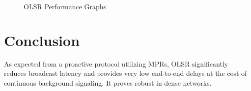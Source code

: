 \documentclass[12pt,a4paper]{report}
\begin{document}
\begin{figure}[H]
    \centering
    \caption{OLSR Performance Graphs}
\end{figure}

\section{Conclusion}
As expected from a proactive protocol utilizing MPRs, OLSR significantly reduces broadcast latency and provides very low end-to-end delays at the cost of continuous background signaling. It proves robust in dense networks.
\end{document}
